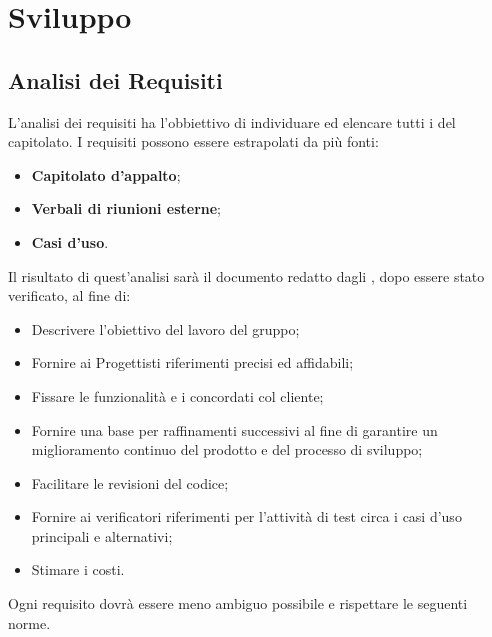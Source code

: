 \documentclass[NormeDiProgetto.tex]{subfiles}
\begin{document}
\section{Sviluppo}
\subsection{Analisi dei Requisiti}
L'analisi dei requisiti ha l'obbiettivo di individuare ed elencare tutti i  del capitolato. I requisiti possono essere estrapolati da più fonti:
\begin{itemize}
	\item \textbf{Capitolato d'appalto};
	\item \textbf{Verbali di riunioni esterne};
	\item \textbf{Casi d'uso}.
\end{itemize}
Il risultato di quest'analisi sarà il documento \adr \vruno redatto dagli \alisti, dopo essere stato verificato, al fine di:
\begin{itemize}
\item Descrivere l'obiettivo del lavoro del gruppo;
\item Fornire ai Progettisti riferimenti precisi ed affidabili;
\item Fissare le funzionalità e i  concordati col cliente;
\item Fornire una base per raffinamenti successivi al fine di garantire un
miglioramento continuo del prodotto e del processo di sviluppo;
\item Facilitare le revisioni del codice;
\item Fornire ai verificatori riferimenti per l'attività di test circa i casi d'uso principali e alternativi;
\item Stimare i costi.
\end{itemize}
Ogni requisito dovrà essere meno ambiguo possibile e rispettare le seguenti norme.
\end{document}
